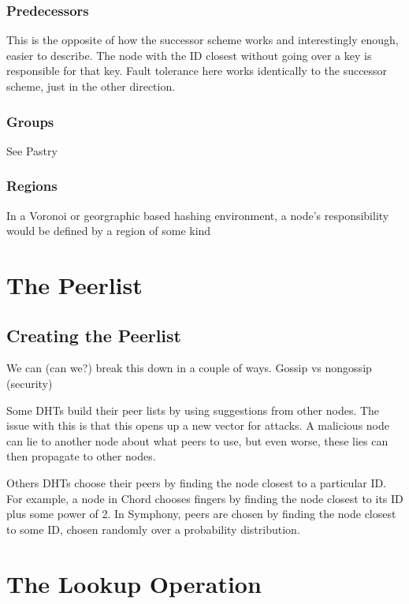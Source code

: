 \documentclass[10pt,letterpaper]{report}
\begin{document}
\subsubsection{Predecessors}
This is the opposite of how the successor scheme works and interestingly enough, easier to describe.  The node with the ID closest without going over a key is responsible for that key.  Fault tolerance here works identically to the successor scheme, just in the other direction.


\subsubsection{Groups}

See Pastry

\subsubsection{Regions}
In a Voronoi or georgraphic based hashing environment, a node's responsibility would be defined by a region of some kind





\section{The Peerlist}


\subsection{Creating the Peerlist}
We can (can we?) break this down in a couple of ways.  Gossip vs nongossip (security)


Some DHTs build their peer lists by using suggestions from other nodes.  The issue with this is that this opens up a new vector for attacks.   A malicious node can lie to another node about what peers to use, but even worse, these lies can then propagate to other nodes.

Others DHTs choose their peers by finding the node closest to a particular ID.  For example, a node in Chord chooses fingers by finding the node closest to its ID plus some  power of 2.    In Symphony, peers are chosen by finding the node closest to some ID, chosen randomly over a probability distribution.



\section{The Lookup Operation} 
\end{document}

